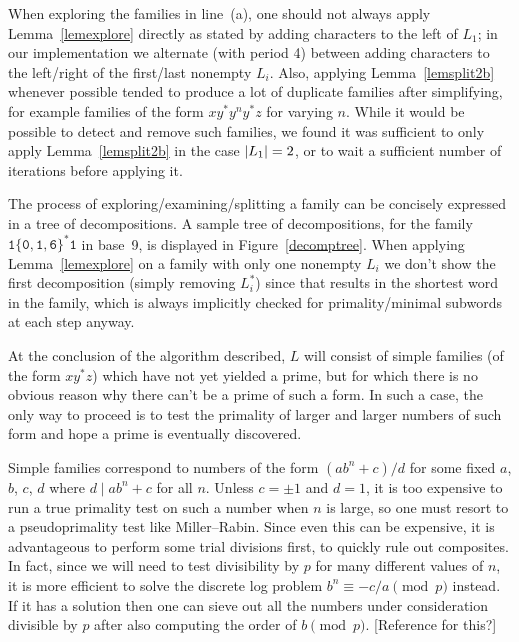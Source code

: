 \documentclass[12pt]{article}
\DeclarePairedDelimiter\abs{\lvert}{\rvert}
\theoremstyle{plain}
\theoremstyle{definition}
\theoremstyle{remark}
\newcommand{\0}{\mathtt{0}}
\newcommand{\1}{\mathtt{1}}
\newcommand{\2}{\mathtt{2}}
\newcommand{\3}{\mathtt{3}}
\newcommand{\4}{\mathtt{4}}
\newcommand{\5}{\mathtt{5}}
\newcommand{\6}{\mathtt{6}}
\newcommand{\7}{\mathtt{7}}
\newcommand{\8}{\mathtt{8}}
\newcommand{\9}{\mathtt{9}}
\begin{document}
When exploring the families in line~(a), one should not always apply Lemma~\ref{lemexplore} directly as stated by adding
characters to the left of $L_1$; in our implementation we alternate (with period 4) between adding characters
to the left/right of the first/last nonempty $L_i$.  Also, applying Lemma~\ref{lemsplit2b} whenever possible tended to
produce a lot of duplicate families after simplifying, for example families of the form $xy^*y^ny^*z$ for varying $n$.
While it would be possible to detect and remove such families, we found it was sufficient to only apply
Lemma~\ref{lemsplit2b} in the case $\abs{L_1}=2$, or to wait a sufficient number of iterations before applying it.

The process of exploring/examining/splitting a family can be concisely expressed in a tree of decompositions.
A sample tree of decompositions, for the family $\1\{\0,\1,\6\}^*\1$ in base~9, is displayed in Figure~\ref{decomptree}.
When applying Lemma~\ref{lemexplore} on a family with only one nonempty $L_i$ we don't show the first decomposition
(simply removing $L_i^*$) since that results in the shortest word in the family, which is always implicitly
checked for primality/minimal subwords at each step anyway.

At the conclusion of the algorithm described, $L$ will consist of simple families (of the form $xy^*z$) which have not yet
yielded a prime, but for which there is no obvious reason why there can't be a prime of such a form.
In such a case, the only way to proceed is to test the primality of larger and larger numbers of such form and hope
a prime is eventually discovered.

Simple families correspond to numbers of the form $(ab^n+c)/d$ for some fixed $a$, $b$, $c$, $d$ where $d\mid ab^n+c$ for all $n$.
Unless $c=\pm1$ and $d=1$, it is too expensive to run a true primality test on such a number when $n$ is large, so one
must resort to a pseudoprimality test like Miller--Rabin.  Since even this can be expensive, it is advantageous to perform
some trial divisions first, to quickly rule out composites.  In fact, since we will need to test divisibility by $p$ for many
different values of $n$, it is more efficient to solve the discrete log problem $b^n\equiv-c/a\pmod{p}$ instead.
If it has a solution then one can sieve out all the numbers under consideration divisible by $p$ after also computing
the order of $b\pmod{p}$. [Reference for this?]
\end{document}
